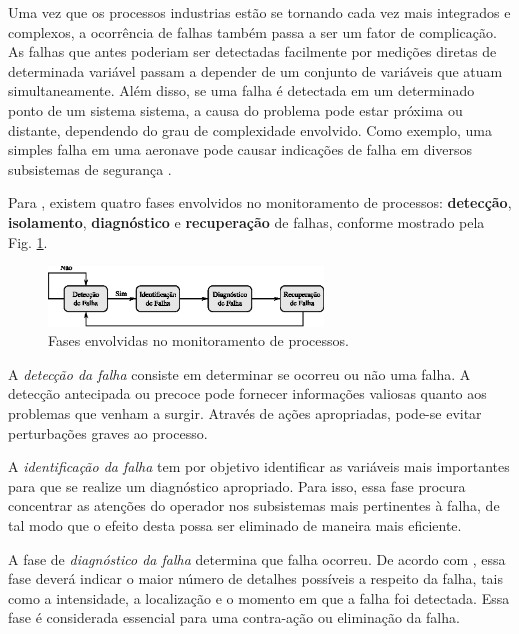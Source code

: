 Uma vez que os processos industrias estão se tornando cada vez mais integrados e
complexos, a ocorrência de falhas também passa a ser um fator de complicação. As
falhas que antes poderiam ser detectadas facilmente por medições diretas de
determinada variável passam a depender de um conjunto de variáveis que atuam
simultaneamente. Além disso, se uma falha é detectada em um determinado ponto de
um sistema sistema, a causa do problema pode estar próxima ou distante,
dependendo do grau de complexidade envolvido. Como exemplo, uma simples falha em
uma aeronave pode causar indicações de falha em diversos subsistemas de
segurança \cite{vach:2006}.

Para , existem quatro fases envolvidos no monitoramento
de processos: {\bf detecção}, {\bf isolamento}, {\bf diagnóstico} e {\bf
recuperação} de falhas, conforme mostrado pela Fig.
\ref{fig:fases_monitoramento}.

\begin{figure}[htb]
\centering
    \includegraphics[width=0.65\textwidth]
                    {imgs/detec_diag/eps/fases_monitoramento}
    \caption{Fases envolvidas no monitoramento de processos.}
    \label{fig:fases_monitoramento}
\end{figure}

A {\it detecção da falha} consiste em determinar se ocorreu ou não uma falha. A
detecção antecipada ou precoce pode fornecer informações valiosas quanto aos
problemas que venham a surgir. Através de ações apropriadas, pode-se evitar
perturbações graves ao processo.

A {\it identificação da falha} tem por objetivo identificar as variáveis mais
importantes para que se realize um diagnóstico apropriado. Para isso, essa fase
procura concentrar as atenções do operador nos subsistemas mais pertinentes à
falha, de tal modo que o efeito desta possa ser eliminado de maneira mais
eficiente.

A fase de {\it diagnóstico da falha} determina que falha ocorreu. De acordo com
, essa fase deverá indicar o maior número de detalhes
possíveis a respeito da falha, tais como a intensidade, a localização e o
momento em que a falha foi detectada. Essa fase é considerada essencial para uma
contra-ação ou eliminação da falha.

